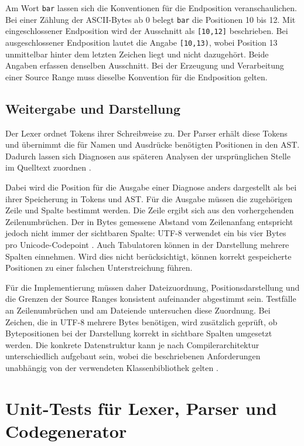 \documentclass[11pt,a4paper]{article}
\newcommand{\code}[1]{\texttt{#1}}
\begin{document}
Am Wort \code{bar} lassen sich die Konventionen für die Endposition veranschaulichen. Bei einer Zählung der ASCII-Bytes ab 0 belegt \code{bar} die Positionen 10 bis 12. Mit eingeschlossener Endposition wird der Ausschnitt als \code{[10,12]} beschrieben. Bei ausgeschlossener Endposition lautet die Angabe \code{[10,13)}, wobei Position 13 unmittelbar hinter dem letzten Zeichen liegt und nicht dazugehört. Beide Angaben erfassen denselben Ausschnitt. Bei der Erzeugung und Verarbeitung einer Source Range muss dieselbe Konvention für die Endposition gelten.

\subsection{Weitergabe und Darstellung}
Der Lexer ordnet Tokens ihrer Schreibweise zu. Der Parser erhält diese Tokens und übernimmt die für Namen und Ausdrücke benötigten Positionen in den AST. Dadurch lassen sich Diagnosen aus späteren Analysen der ursprünglichen Stelle im Quelltext zuordnen \cite{clang}.

Dabei wird die Position für die Ausgabe einer Diagnose anders dargestellt als bei ihrer Speicherung in Tokens und AST. Für die Ausgabe müssen die zugehörigen Zeile und Spalte bestimmt werden. Die Zeile ergibt sich aus den vorhergehenden Zeilenumbrüchen. Der in Bytes gemessene Abstand vom Zeilenanfang entspricht jedoch nicht immer der sichtbaren Spalte: UTF-8 verwendet ein bis vier Bytes pro Unicode-Codepoint \cite[Abschnitt~3]{uft8}. Auch Tabulatoren können in der Darstellung mehrere Spalten einnehmen. Wird dies nicht berücksichtigt, können korrekt gespeicherte Positionen zu einer falschen Unterstreichung führen.

Für die Implementierung müssen daher Dateizuordnung, Positionsdarstellung und die Grenzen der Source Ranges konsistent aufeinander abgestimmt sein. Testfälle an Zeilenumbrüchen und am Dateiende untersuchen diese Zuordnung. Bei Zeichen, die in UTF-8 mehrere Bytes benötigen, wird zusätzlich geprüft, ob Bytepositionen bei der Darstellung korrekt in sichtbare Spalten umgesetzt werden. Die konkrete Datenstruktur kann je nach Compilerarchitektur unterschiedlich aufgebaut sein, wobei die beschriebenen Anforderungen unabhängig von der verwendeten Klassenbibliothek gelten \cite{clang,utf8}.

\section{Unit-Tests für Lexer, Parser und Codegenerator}
\end{document}
